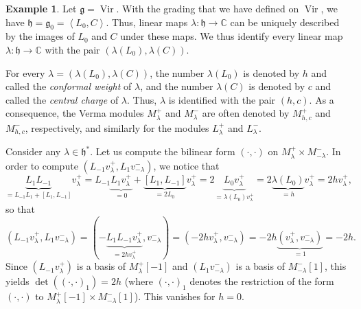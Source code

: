 \documentclass
[numbers=enddot,12pt,final,onecolumn,german,notitlepage]{scrartcl}%
\theoremstyle{definition}
\newtheorem{example}[theo]{Example}
\begin{document}
\begin{example}
\label{exa.Vir}Let $\mathfrak{g}=\operatorname*{Vir}$. With the grading that
we have defined on $\operatorname*{Vir}$, we have $\mathfrak{h}=\mathfrak{g}%
_{0}=\left\langle L_{0},C\right\rangle $. Thus, linear maps $\lambda
:\mathfrak{h}\rightarrow\mathbb{C}$ can be uniquely described by the images of
$L_{0}$ and $C$ under these maps. We thus identify every linear map
$\lambda:\mathfrak{h}\rightarrow\mathbb{C}$ with the pair $\left(
\lambda\left(  L_{0}\right)  ,\lambda\left(  C\right)  \right)  $.

For every $\lambda=\left(  \lambda\left(  L_{0}\right)  ,\lambda\left(
C\right)  \right)  $, the number $\lambda\left(  L_{0}\right)  $ is denoted by
$h$ and called the \textit{conformal weight} of $\lambda$, and the number
$\lambda\left(  C\right)  $ is denoted by $c$ and called the \textit{central
charge} of $\lambda$. Thus, $\lambda$ is identified with the pair $\left(
h,c\right)  $. As a consequence, the Verma modules $M_{\lambda}^{+}$ and
$M_{\lambda}^{-}$ are often denoted by $M_{h,c}^{+}$ and $M_{h,c}^{-}$,
respectively, and similarly for the modules $L_{\lambda}^{+}$ and $L_{\lambda
}^{-}$.

Consider any $\lambda\in\mathfrak{h}^{\ast}$. Let us compute the bilinear form
$\left(  \cdot,\cdot\right)  $ on $M_{\lambda}^{+}\times M_{-\lambda}^{-}$. In
order to compute $\left(  L_{-1}v_{\lambda}^{+},L_{1}v_{-\lambda}^{-}\right)
$, we notice that
\[
\underbrace{L_{1}L_{-1}}_{=L_{-1}L_{1}+\left[  L_{1},L_{-1}\right]
}v_{\lambda}^{+}=L_{-1}\underbrace{L_{1}v_{\lambda}^{+}}_{=0}%
+\underbrace{\left[  L_{1},L_{-1}\right]  }_{=2L_{0}}v_{\lambda}%
^{+}=2\underbrace{L_{0}v_{\lambda}^{+}}_{=\lambda\left(  L_{0}\right)
v_{\lambda}^{+}}=2\underbrace{\lambda\left(  L_{0}\right)  }_{=h}v_{\lambda
}^{+}=2hv_{\lambda}^{+},
\]
so that%
\[
\left(  L_{-1}v_{\lambda}^{+},L_{1}v_{-\lambda}^{-}\right)  =\left(
-\underbrace{L_{1}L_{-1}v_{\lambda}^{+}}_{=2hv_{\lambda}^{+}},v_{-\lambda}%
^{-}\right)  =\left(  -2hv_{\lambda}^{+},v_{-\lambda}^{-}\right)
=-2h\underbrace{\left(  v_{\lambda}^{+},v_{-\lambda}^{-}\right)  }_{=1}=-2h.
\]
Since $\left(  L_{-1}v_{\lambda}^{+}\right)  $ is a basis of $M_{\lambda}%
^{+}\left[  -1\right]  $ and $\left(  L_{1}v_{-\lambda}^{-}\right)  $ is a
basis of $M_{-\lambda}^{-}\left[  1\right]  $, this yields $\det\left(
\left(  \cdot,\cdot\right)  _{1}\right)  =2h$ (where $\left(  \cdot
,\cdot\right)  _{1}$ denotes the restriction of the form $\left(  \cdot
,\cdot\right)  $ to $M_{\lambda}^{+}\left[  -1\right]  \times M_{-\lambda}%
^{-}\left[  1\right]  $). This vanishes for $h=0$.


\end{example}
\end{document}
